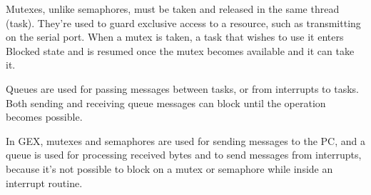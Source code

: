 Mutexes, unlike semaphores, must be taken and released in the same thread (task). They're used to guard exclusive access to a resource, such as transmitting on the serial port. When a mutex is taken, a task that wishes to use it enters Blocked state and is resumed once the mutex becomes available and it can take it.

Queues are used for passing messages between tasks, or from interrupts to tasks. Both sending and receiving queue messages can block until the operation becomes possible. 

In GEX, mutexes and semaphores are used for sending messages to the PC, and a queue is used for processing received bytes and to send messages from interrupts, because it's not possible to block on a mutex or semaphore while inside an interrupt routine.



